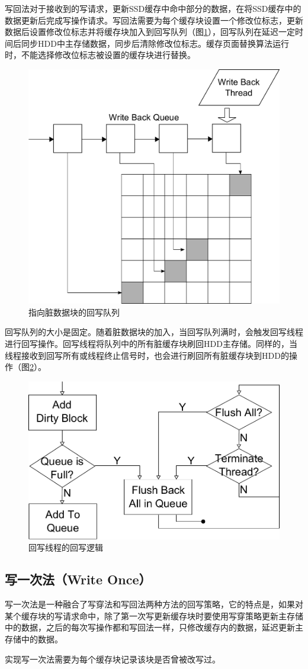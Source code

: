 写回法\cite{writeback2008}对于接收到的写请求，更新SSD缓存中命中部分的数据，在将SSD缓存中的数据更新后完成写操作请求。写回法需要为每个缓存块设置一个修改位标志，更新数据后设置修改位标志并将缓存块加入到回写队列（图\ref{fig:write-back-queue}），回写队列在延迟一定时间后同步HDD中主存储数据，同步后清除修改位标志。缓存页面替换算法运行时，不能选择修改位标志被设置的缓存块进行替换。

\begin{figure}[H]
\centering
\includegraphics[width=0.4\linewidth]{./graph/write-back-queue}
\caption{指向脏数据块的回写队列}
\label{fig:write-back-queue}
\end{figure}

回写队列的大小是固定。随着脏数据块的加入，当回写队列满时，会触发回写线程进行回写操作。回写线程将队列中的所有脏缓存块刷回HDD主存储。同样的，当线程接收到回写所有或线程终止信号时，也会进行刷回所有脏缓存块到HDD的操作（图\ref{fig:write-back-thread}）。

\begin{figure}[H]
\centering
\includegraphics[width=0.6\linewidth]{./graph/write-back-thread}
\caption{回写线程的回写逻辑}
\label{fig:write-back-thread}
\end{figure}

\subsection{写一次法（Write Once）}
写一次法是一种融合了写穿法和写回法两种方法的回写策略，它的特点是，如果对某个缓存块的写请求命中，除了第一次写更新缓存块时要使用写穿策略更新主存储中的数据，之后的每次写操作都和写回法一样，只修改缓存内的数据，延迟更新主存储中的数据。

实现写一次法需要为每个缓存块记录该块是否曾被改写过。

